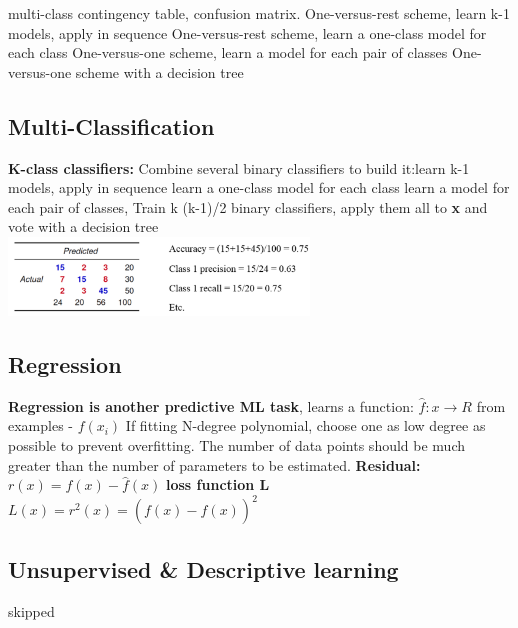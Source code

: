 \documentclass[cheatsheet.tex]{subfiles}
\begin{document}
multi-class contingency table,  confusion matrix. 
\textbullet One-versus-rest scheme, learn k-1 models, apply in sequence \textbullet One-versus-rest scheme, learn a one-class model for each class \textbullet One-versus-one scheme, learn a model for each pair of classes \textbullet One-versus-one scheme with a decision tree
\subsection{Multi-Classification}
\textbf{K-class classifiers:} Combine several binary classifiers to build it:\textbullet learn k-1 models, apply in sequence \textbullet learn a one-class model for each class \textbullet learn a model for each pair of classes, Train k (k-1)/2 binary classifiers, apply them all to \textbf{x} and vote \textbullet with a decision tree
\\
\includegraphics[width=80mm]{confusion_matrix.png}
\subsection{Regression}
\textbf{Regression is another predictive ML task}, learns a function: $\hat{f} : x \rightarrow R$ from examples - $f(x_i)$ \textbullet If fitting N-degree polynomial, choose one as low degree as possible to prevent overfitting. \textbullet The number of data points should be much greater than the number of parameters to be estimated. \textbullet \textbf{Residual:} $r(x)=f(x)-\hat{f}(x)$ \textbullet \textbf{loss function L} $L(x)=r^2(x)=(f(x)-\hat{f}(x))^2$
\subsection{Unsupervised \& Descriptive learning}
skipped
\end{document}
